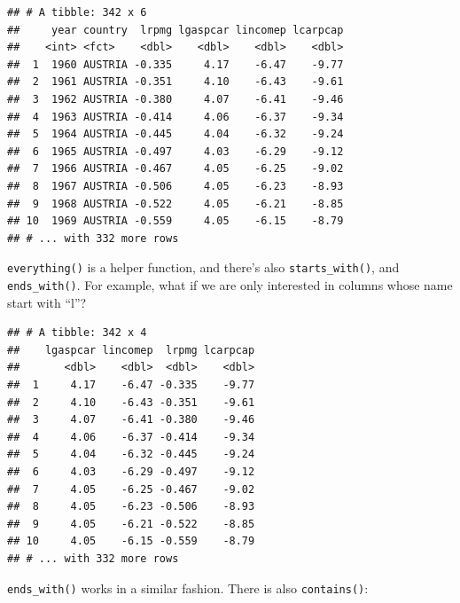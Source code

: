 \documentclass[]{gitbook}
\newenvironment{Shaded}{\begin{snugshade}}{\end{snugshade}}
\newcommand{\KeywordTok}[1]{\textcolor[rgb]{0.13,0.29,0.53}{\textbf{#1}}}
\newcommand{\NormalTok}[1]{#1}
\newcommand{\OperatorTok}[1]{\textcolor[rgb]{0.81,0.36,0.00}{\textbf{#1}}}
\newcommand{\StringTok}[1]{\textcolor[rgb]{0.31,0.60,0.02}{#1}}
\begin{document}
\begin{verbatim}
## # A tibble: 342 x 6
##     year country  lrpmg lgaspcar lincomep lcarpcap
##    <int> <fct>    <dbl>    <dbl>    <dbl>    <dbl>
##  1  1960 AUSTRIA -0.335     4.17    -6.47    -9.77
##  2  1961 AUSTRIA -0.351     4.10    -6.43    -9.61
##  3  1962 AUSTRIA -0.380     4.07    -6.41    -9.46
##  4  1963 AUSTRIA -0.414     4.06    -6.37    -9.34
##  5  1964 AUSTRIA -0.445     4.04    -6.32    -9.24
##  6  1965 AUSTRIA -0.497     4.03    -6.29    -9.12
##  7  1966 AUSTRIA -0.467     4.05    -6.25    -9.02
##  8  1967 AUSTRIA -0.506     4.05    -6.23    -8.93
##  9  1968 AUSTRIA -0.522     4.05    -6.21    -8.85
## 10  1969 AUSTRIA -0.559     4.05    -6.15    -8.79
## # ... with 332 more rows
\end{verbatim}

\texttt{everything()} is a helper function, and there's also \texttt{starts\_with()},
and \texttt{ends\_with()}. For example, what if we are only interested
in columns whose name start with ``l''?

\begin{Shaded}
\end{Shaded}

\begin{verbatim}
## # A tibble: 342 x 4
##    lgaspcar lincomep  lrpmg lcarpcap
##       <dbl>    <dbl>  <dbl>    <dbl>
##  1     4.17    -6.47 -0.335    -9.77
##  2     4.10    -6.43 -0.351    -9.61
##  3     4.07    -6.41 -0.380    -9.46
##  4     4.06    -6.37 -0.414    -9.34
##  5     4.04    -6.32 -0.445    -9.24
##  6     4.03    -6.29 -0.497    -9.12
##  7     4.05    -6.25 -0.467    -9.02
##  8     4.05    -6.23 -0.506    -8.93
##  9     4.05    -6.21 -0.522    -8.85
## 10     4.05    -6.15 -0.559    -8.79
## # ... with 332 more rows
\end{verbatim}

\texttt{ends\_with()} works in a similar fashion. There is also \texttt{contains()}:

\begin{Shaded}
\end{Shaded}
\end{document}
